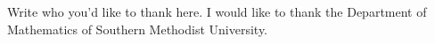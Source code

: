 
Write who you'd like to thank here.  I would like to thank the Department of Mathematics of Southern Methodist University.
